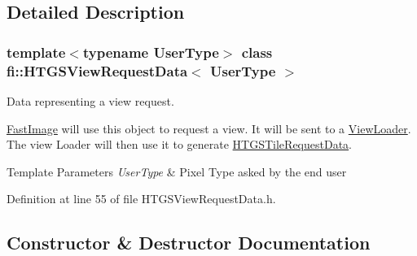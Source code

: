 \subsection{Detailed Description}
\subsubsection*{template$<$typename User\+Type$>$\newline
class fi\+::\+H\+T\+G\+S\+View\+Request\+Data$<$ User\+Type $>$}

Data representing a view request. 

\hyperlink{classfi_1_1FastImage}{Fast\+Image} will use this object to request a view. It will be sent to a \hyperlink{classfi_1_1ViewLoader}{View\+Loader}. The view Loader will then use it to generate \hyperlink{classfi_1_1HTGSTileRequestData}{H\+T\+G\+S\+Tile\+Request\+Data}.


\begin{DoxyTemplParams}{Template Parameters}
{\em User\+Type} & Pixel Type asked by the end user \\
\hline
\end{DoxyTemplParams}


Definition at line 55 of file H\+T\+G\+S\+View\+Request\+Data.\+h.



\subsection{Constructor \& Destructor Documentation}
\mbox{\label{classfi_1_1HTGSViewRequestData_a719f2451d3323b1fef9739905411ff9b}} 
